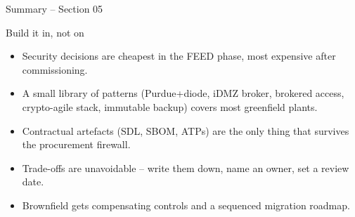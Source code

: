 \documentclass[aspectratio=169,11pt]{beamer}
\def\sectionNumber{05}
\begin{document}
\begin{frame}{Summary -- Section \sectionNumber}
\begin{takeawaybox}{Build it in, not on}
\begin{itemize}\setlength{\itemsep}{2pt}
  \item Security decisions are cheapest in the FEED phase, most expensive after commissioning.
  \item A small library of patterns (Purdue+diode, iDMZ broker, brokered access, crypto-agile stack, immutable backup) covers most greenfield plants.
  \item Contractual artefacts (SDL, SBOM, ATPs) are the only thing that survives the procurement firewall.
  \item Trade-offs are unavoidable -- write them down, name an owner, set a review date.
  \item Brownfield gets compensating controls and a sequenced migration roadmap.
\end{itemize}
\end{takeawaybox}
\end{frame}
\end{document}
